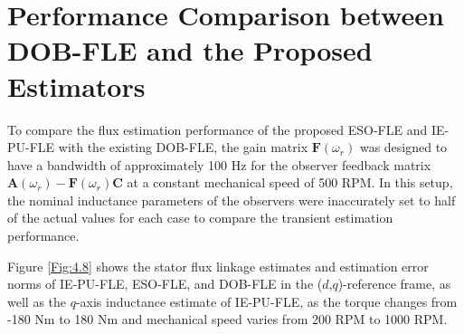\section{Performance Comparison between DOB-FLE and the Proposed Estimators}

To compare the flux estimation performance of the proposed ESO-FLE and IE-PU-FLE with the existing DOB-FLE, the gain matrix ${{\boldsymbol{F}({\omega}_{r})}}$ was designed to have a bandwidth of approximately 100 Hz for the observer feedback matrix ${{\boldsymbol{A}}({\omega}_{r})} - {{\boldsymbol{F}({\omega}_{r})}} {{\boldsymbol{C}}}$ at a constant mechanical speed of 500 RPM. In this setup, the nominal inductance parameters of the observers were inaccurately set to half of the actual values for each case to compare the transient estimation performance.

Figure \ref{Fig:4.8} shows the stator flux linkage estimates and estimation error norms of IE-PU-FLE, ESO-FLE, and DOB-FLE in the ($d$,$q$)-reference frame, as well as the $q$-axis inductance estimate of IE-PU-FLE, as the torque changes from  -180 Nm to 180 Nm and mechanical speed varies from 200 RPM to 1000 RPM. 

